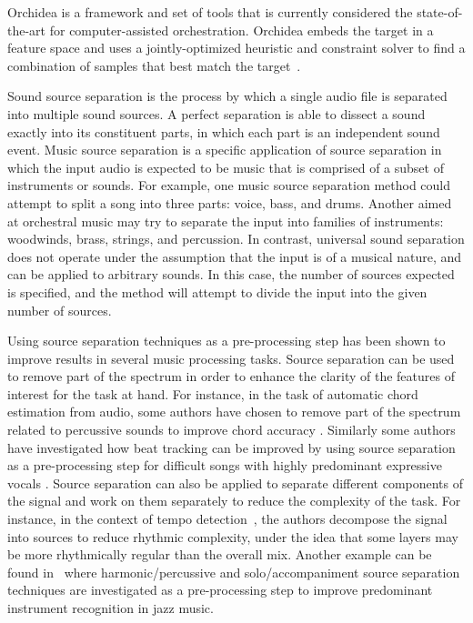 \documentclass{article}
\begin{document}
	 Orchidea is a framework and set of tools that is currently considered the state-of-the-art for computer-assisted orchestration. Orchidea embeds the target in a feature space and uses a jointly-optimized heuristic and constraint solver to find a combination of samples that best match the target~\cite{Cella18, Cella2020}.

	Sound source separation is the process by which a single audio file is separated into multiple sound sources. A perfect separation is able to dissect a sound exactly into its constituent parts, in which each part is an independent sound event. Music source separation is a specific application of source separation in which the input audio is expected to be music that is comprised of a subset of instruments or sounds. For example, one music source separation method could attempt to split a song into three parts: voice, bass, and drums. Another aimed at orchestral music may try to separate the input into families of instruments: woodwinds, brass, strings, and percussion. In contrast, universal sound separation does not operate under the assumption that the input is of a musical nature, and can be applied to arbitrary sounds. In this case, the number of sources expected is specified, and the method will attempt to divide the input into the given number of sources.		
	
	Using source separation techniques as a pre-processing step has been shown to improve results in several music processing tasks. Source separation can be used to remove part of the spectrum in order to enhance the clarity of the features of interest for the task at hand. For instance, in the task of automatic chord estimation from audio, some authors have chosen to remove part of the spectrum related to percussive sounds to improve chord accuracy \cite{Reed_al2009}. Similarly some authors have investigated how beat tracking can be improved by using source separation as a pre-processing step for difficult songs with highly predominant expressive vocals \cite{ZapGom2012}. Source separation can also be applied to separate different components of the signal and work on them separately to reduce the complexity of the task. For instance, in the context of tempo detection~\cite{ChoRae2009}, the authors decompose the signal into sources to reduce rhythmic complexity, under the idea that some layers may be more rhythmically regular than the overall mix. Another example can be found in~\cite{GomAbecan2018} where harmonic/percussive and solo/accompaniment source separation techniques are investigated as a pre-processing step to improve predominant instrument recognition in jazz music.
		
\end{document}
